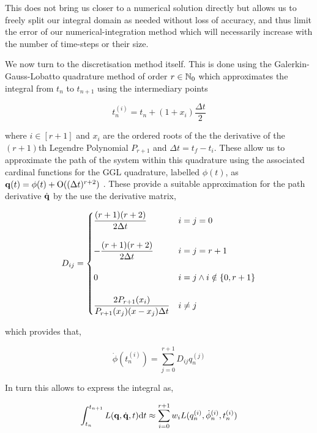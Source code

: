 \documentclass[10pt]{iopart}
\begin{document}
This does not bring us closer to a numerical solution directly but allows us to freely split our integral domain as needed without loss of accuracy, and thus limit the error of our numerical-integration method which will necessarily increase with the number of time-steps or their size.

We now turn to the discretisation method itself. This is done using the Galerkin-Gauss-Lobatto quadrature method of order $r \in \mathbb{N}_0$\cite{tsangSLIMPLECTICINTEGRATORSVARIATIONAL2015} which approximates the integral from $t_n$ to $t_{n + 1}$ using the intermediary points

\begin{equation}
  t^{(i)}_n = t_n + (1 + x_i)\frac{\Delta t}{2}
\end{equation}

where $i \in [r + 1]$ and $x_i$ are the ordered roots of the the derivative of the $(r + 1)$th Legendre Polynomial $P_{r + 1}$ and $\Delta t = t_f - t_i$. These allow us to approximate the path of the system within this quadrature using the associated cardinal functions for the GGL quadrature, labelled $\phi(t)$, as \(\vb q(t) = \phi(t) + \mathord{\mathrm{O}}((\Delta t)^{r + 2})\) . These provide a suitable approximation for the path derivative $\dot{\vb q}$ by the use the derivative matrix,

\begin{equation}
  D_{ij} = \begin{cases}
  	\dfrac{(r + 1)(r + 2)}{2\Delta t} &i = j = 0 \\\\
  	-\dfrac{(r + 1)(r + 2)}{2\Delta t} & i = j = r + 1 \\\\
  	0 & i = j \land i \notin \left\{0, r + 1\right\} \\\\
  	\dfrac{2P_{r + 1}(x_i)}{P_{r+1}(x_j)(x - x_j)\Delta t} & i\neq j
  \end{cases}
\end{equation}

which provides that,

\begin{equation}
  \dot\phi(t_n^{(i)}) = \sum_{j = 0}^{r + 1} D_{ij}q_n^{(j)}
\end{equation}

In turn this allows to express the integral as,

\begin{equation}
\label{eq:discr-action-1}
  \int_{t_n}^{t_{n + 1}} L(\vb q, \dot{\vb q}, t) \dd t \approx \sum_{i = 0}^{r + 1} w_i L(q_{n}^{(i)}, \dot\phi_{n}^{(i)}, t_{n}^{(i)})
\end{equation}
\end{document}
